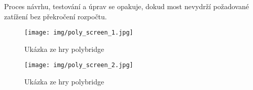Proces návrhu, testování a úprav se opakuje, dokud most nevydrží požadované zatížení bez překročení rozpočtu.

\begin{figure}[p]\centering
\texttt{[image: img/poly\_screen\_1.jpg]}
\caption{Ukázka ze hry polybridge \citet{drycactus}}
\label{poly-fig:1}

\end{figure}

\begin{figure}[p]\centering
\texttt{[image: img/poly\_screen\_2.jpg]}
\caption{Ukázka ze hry polybridge \citet{drycactus}}
\label{poly-fig:2}
\end{figure}



